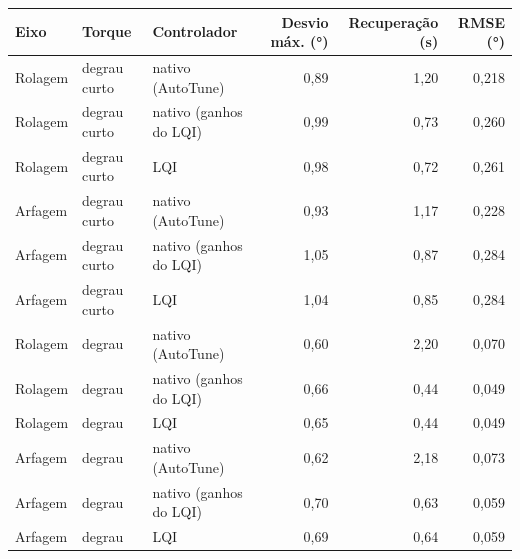 \begin{tabular}{lllrrr}
\toprule
Eixo & Torque & Controlador & Desvio máx. (\si{\degree}) & Recuperação (\si{\second}) & RMSE (\si{\degree}) \\
\midrule
Rolagem & degrau curto & nativo (AutoTune) & 0,89 & 1,20 & 0,218 \\
Rolagem & degrau curto & nativo (ganhos do LQI) & 0,99 & 0,73 & 0,260 \\
Rolagem & degrau curto & LQI & 0,98 & 0,72 & 0,261 \\
Arfagem & degrau curto & nativo (AutoTune) & 0,93 & 1,17 & 0,228 \\
Arfagem & degrau curto & nativo (ganhos do LQI) & 1,05 & 0,87 & 0,284 \\
Arfagem & degrau curto & LQI & 1,04 & 0,85 & 0,284 \\
\addlinespace
Rolagem & degrau & nativo (AutoTune) & 0,60 & 2,20 & 0,070 \\
Rolagem & degrau & nativo (ganhos do LQI) & 0,66 & 0,44 & 0,049 \\
Rolagem & degrau & LQI & 0,65 & 0,44 & 0,049 \\
Arfagem & degrau & nativo (AutoTune) & 0,62 & 2,18 & 0,073 \\
Arfagem & degrau & nativo (ganhos do LQI) & 0,70 & 0,63 & 0,059 \\
Arfagem & degrau & LQI & 0,69 & 0,64 & 0,059 \\
\bottomrule
\end{tabular}
